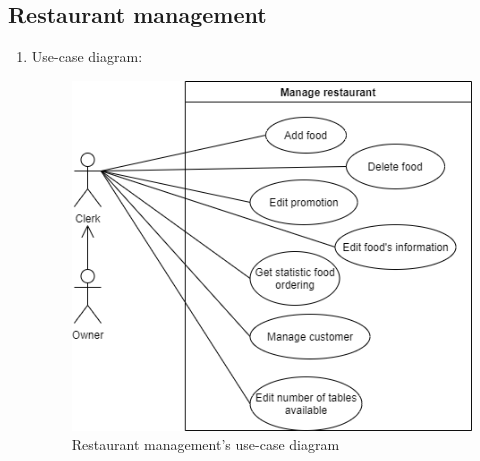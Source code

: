 \newpage
\subsection{Restaurant management}
\begin{enumerate}
    \item Use-case diagram:
    \begin{center}
        \begin{figure}[!h]
            \begin{center}
                \includegraphics[scale=.5]{Images/managementDiagram.png} 
            \end{center} 
            \vspace{1cm}
            \caption{Restaurant management's use-case diagram}
        \end{figure}    
    \end{center}
    

\end{enumerate}
